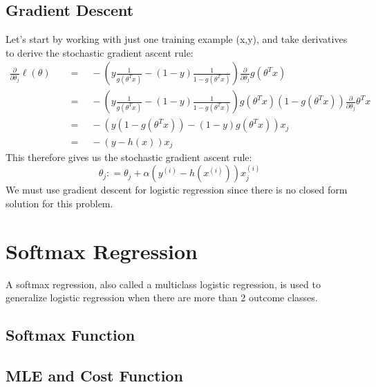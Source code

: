 \documentclass[twoside,twocolumn]{article}
\begin{document}
\subsection{Gradient Descent}
Let’s start by working with just one training example (x,y), and take
derivatives to derive the stochastic gradient ascent rule:
\begin{equation}
  \begin{aligned}
    \frac { \partial } { \partial \theta _ { j } } \ell ( \theta ) \quad & = \quad - \left( y \frac { 1 } { g \left( \theta ^ { T } x \right) } - ( 1 - y ) \frac { 1 } { 1 - g \left( \theta ^ { T } x \right) } \right) \frac { \partial } { \partial \theta _ { j } } g \left( \theta ^ { T } x \right) \\
    & = \quad - \left( y \frac { 1 } { g \left( \theta ^ { T } x \right) } - ( 1 - y ) \frac { 1 } { 1 - g \left( \theta ^ { T } x \right) } \right) g \left( \theta ^ { T } x \right) \left( 1 - g \left( \theta ^ { T } x \right) \right) \frac { \partial } { \partial \theta _ { j } } \theta ^ { T } x \\
    & = \quad - \left( y \left( 1 - g \left( \theta ^ { T } x \right) \right) - ( 1 - y ) g \left( \theta ^ { T } x \right) \right) x _ { j } \\
    & = \quad - \left( y - h ( x ) \right) x _ { j }
  \end{aligned}
\end{equation}
This therefore gives us the stochastic gradient ascent rule:
\begin{equation}
  \theta _ { j } : = \theta _ { j } + \alpha \left( y ^ { ( i ) } - h \left( x ^ { ( i ) } \right) \right) x _ { j } ^ { ( i ) }
\end{equation}
We must use gradient descent for logistic regression since there is no closed
form solution for this problem.
\section{Softmax Regression}
A softmax regression, also called a multiclass logistic regression, is
used to generalize logistic regression when there are more than 2 outcome
classes.
\subsection{Softmax Function}
\subsection{MLE and Cost Function}
\end{document}
